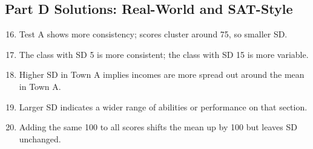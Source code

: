 \documentclass[12pt]{article}
\begin{document}
\subsection*{Part D Solutions: Real-World and SAT-Style}
\begin{enumerate}
  \setcounter{enumi}{15}
  \item Test A shows more consistency; scores cluster around 75, so smaller SD.
  \item The class with SD 5 is more consistent; the class with SD 15 is more variable.
  \item Higher SD in Town A implies incomes are more spread out around the mean in Town A.
  \item Larger SD indicates a wider range of abilities or performance on that section.
  \item Adding the same 100 to all scores shifts the mean up by 100 but leaves SD unchanged.
\end{enumerate}
\end{document}
